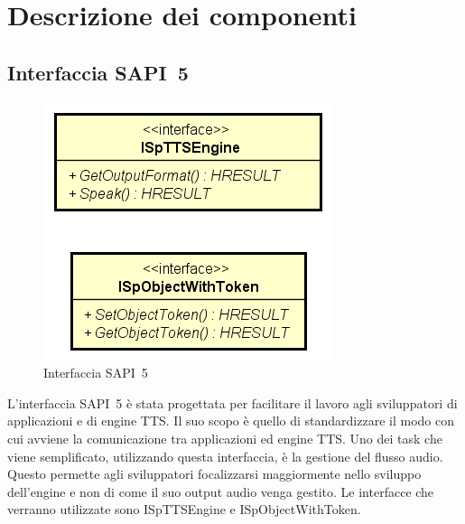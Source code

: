 \chapter{Descrizione dei componenti}
\thispagestyle{empty}

\newpage
\section{Interfaccia SAPI~5}
\begin{figure}[H]
	\centering
	\includegraphics{images/sapi5-interface.png}
	\caption{Interfaccia SAPI~5}
\end{figure}

L'interfaccia SAPI~5 è stata progettata per facilitare il lavoro agli sviluppatori di applicazioni e di engine TTS. Il suo scopo è quello di standardizzare il modo con cui avviene la comunicazione tra applicazioni ed engine TTS. Uno dei task che viene semplificato, utilizzando questa interfaccia, è la gestione del flusso audio. Questo permette agli sviluppatori focalizzarsi maggiormente nello sviluppo dell'engine e non di come il suo output audio venga gestito.
Le interfacce che verranno utilizzate sono ISpTTSEngine e ISpObjectWithToken.
